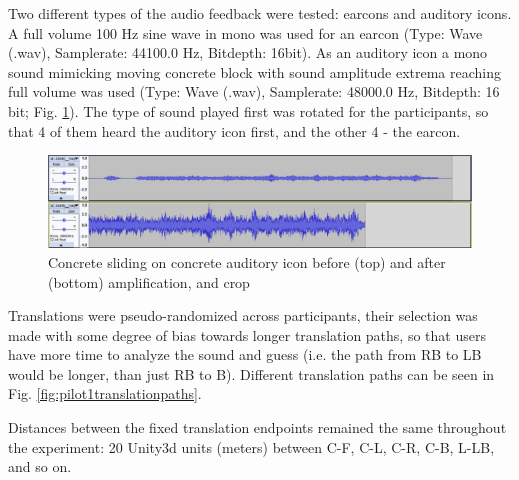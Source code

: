 Two different types of the audio feedback were tested: earcons and auditory icons. A full volume 100 Hz sine wave in mono was used for an earcon (Type: Wave (.wav), Samplerate: 44100.0 Hz, Bitdepth: 16bit). As an auditory icon a mono sound mimicking moving concrete block with sound amplitude extrema reaching full volume was used (Type: Wave (.wav), Samplerate: 48000.0 Hz, Bitdepth: 16 bit; Fig. \ref{fig:pilot1concreteonconcretesoundedit}).
The type of sound played first was rotated for the participants, so that 4 of them heard the auditory icon first, and the other 4 - the earcon.

\begin{figure}
	\centering
	\includegraphics[width=0.7\linewidth]{figures/pilot1_concrete_on_concrete_sound_edit}
	\caption{Concrete sliding on concrete auditory icon before (top) and after (bottom) amplification, and crop}
	\label{fig:pilot1concreteonconcretesoundedit}
\end{figure}

Translations were pseudo-randomized across participants, their selection was made with some degree of bias towards longer translation paths, so that users have more time to analyze the sound and guess (i.e. the path from RB to LB would be longer, than just RB to B). Different translation paths can be seen in Fig. \ref{fig:pilot1translationpaths}.

Distances between the fixed translation endpoints remained the same throughout the experiment: 20 Unity3d units (meters) between C-F, C-L, C-R, C-B, L-LB, and so on.

